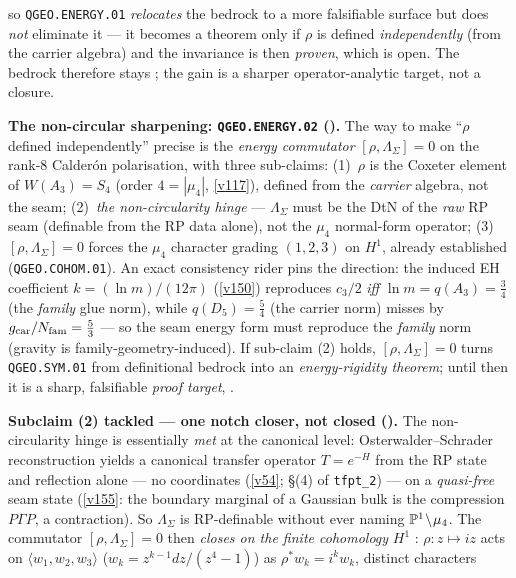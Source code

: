 \begin{keybox}
so \texttt{QGEO.ENERGY.01} \emph{relocates} the bedrock to a more falsifiable surface but does \emph{not}
eliminate it --- it becomes a theorem only if $\rho$ is defined \emph{independently} (from the carrier
algebra) and the invariance is then \emph{proven}, which is open. The bedrock therefore stays \mO; the gain
is a sharper operator-analytic target, not a closure.
\par\smallskip\noindent\textbf{The non-circular sharpening: \texttt{QGEO.ENERGY.02}
().} The way to make ``$\rho$ defined independently'' precise is the
\emph{energy commutator} $[\rho,\Lambda_\Sigma]=0$ on the rank-$8$ Calder\'on polarisation, with three
sub-claims: (1)~$\rho$ is the Coxeter element of $W(A_3)=S_4$ (order $4=|\mu_4|$, \vref{v117}), defined from
the \emph{carrier} algebra, not the seam; (2)~\emph{the non-circularity hinge} --- $\Lambda_\Sigma$ must be
the DtN of the \emph{raw} RP seam (definable from the RP data alone), not the $\mu_4$ normal-form operator;
(3)~$[\rho,\Lambda_\Sigma]=0$ forces the $\mu_4$ character grading $(1,2,3)$ on $H^1$, already established
(\texttt{QGEO.COHOM.01}). An exact consistency rider pins the direction: the induced EH coefficient
$k=(\ln m)/(12\pi)$ (\vref{v150}) reproduces $c_3/2$ \emph{iff} $\ln m=q(A_3)=\tfrac34$ (the \emph{family}
glue norm), while $q(D_5)=\tfrac54$ (the carrier norm) misses by $g_{\mathrm{car}}/N_{\mathrm{fam}}=\tfrac53$ --- so
the seam energy form must reproduce the \emph{family} norm (gravity is family-geometry-induced). If
sub-claim (2) holds, $[\rho,\Lambda_\Sigma]=0$ turns \texttt{QGEO.SYM.01} from definitional bedrock into an
\emph{energy-rigidity theorem}; until then it is a sharp, falsifiable \emph{proof target}, \mO.
\par\smallskip\noindent\textbf{Subclaim (2) tackled --- one notch closer, not closed
().} The non-circularity hinge is essentially \emph{met} at the canonical
level: Osterwalder--Schrader reconstruction yields a canonical transfer operator $T=e^{-H}$ from the RP
state and reflection alone --- no coordinates (\vref{v54}; \S(4) of \texttt{tfpt\_2}) --- on a
\emph{quasi-free} seam state (\vref{v155}: the boundary marginal of a Gaussian bulk is the compression
$P\Gamma P$, a contraction). So $\Lambda_\Sigma$ is RP-definable without ever naming $\mathbb P^1\!\setminus\!\mu_4$.
The commutator $[\rho,\Lambda_\Sigma]=0$ then \emph{closes on the finite cohomology} $H^1$ \mE: $\rho\!:\!z\mapsto iz$
acts on $\langle w_1,w_2,w_3\rangle$ ($w_k=z^{k-1}dz/(z^4-1)$) as $\rho^*w_k=i^k w_k$, distinct characters

\end{keybox}
